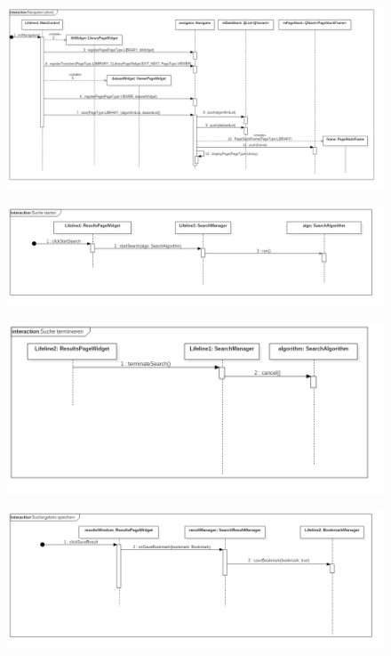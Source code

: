 \begin{figure}[H]
\centering
\includegraphics[width=\linewidth]{img/Sequenzdiagramme/Navigation(short)}
\label{fig:navigation}
\end{figure}

\begin{figure}[H]
\centering
\includegraphics[width=\linewidth]{img/Sequenzdiagramme/SucheStarten}
\label{fig:sucheStarten}
\end{figure}

\begin{figure}[H]
\centering
\includegraphics[width=\linewidth]{img/Sequenzdiagramme/SucheTerminieren}
\label{fig:sucheTerminieren}
\end{figure}

\begin{figure}[H]
\centering
\includegraphics[width=\linewidth]{img/Sequenzdiagramme/SuchergebnisSpeichern}
\label{fig:suchergebnisSpeichern}
\end{figure}